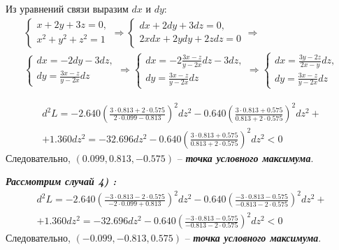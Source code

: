 \documentclass[a5paper, 10pt]{article}
\theoremstyle{definition}
\theoremstyle{plain}
\theoremstyle{remark}
\begin{document}
Из уравнений связи выразим $dx$ и $dy$:
\begin{multline}
\begin{cases}
 x + 2y+3z=0, \\
 x^2 +y^2+z^2=1
\end{cases}
\Rightarrow
\begin{cases}
 dx + 2dy+3dz=0, \\
 2xdx +2ydy+2zdz=0
\end{cases}
\Rightarrow \\
\begin{cases}
 dx = - 2dy-3dz, \\
 dy= \frac{3x - z}{y - 2x}dz
\end{cases}
\Rightarrow 
\begin{cases}
 dx = - 2 \frac{3x - z}{y - 2x}dz-3dz, \\
 dy= \frac{3x - z}{y - 2x}dz
\end{cases}
\Rightarrow 
\begin{cases}
 dx = \frac{3y- 2z}{2x -y}dz, \\
 dy= \frac{3x - z}{y - 2x}dz
\end{cases}
\end{multline}

\begin{multline}
 d^2L = -2.640 \left( \frac{3\cdot 0.813 +2 \cdot 0.575}{2\cdot 0.099 - 0.813} \right)^ 2dz^ 2  -0.640  \left( \frac{3\cdot 0.813 +0.575}{0.813 + 2\cdot 0.575}\right)^ 2dz^ 2  + \\
+ 1.360 dz^2 = -32.696 dz^2 -0.640  \left( \frac{3\cdot 0.813 +0.575}{0.813 + 2\cdot 0.575}\right)^ 2dz^ 2 < 0
\end{multline}
Следовательно, $(0.099, 0.813, -0.575)$ -- \textit{\textbf{точка условного максимума}}.


\newpage
\textit{\textbf{Рассмотрим случай 4) :}}
\begin{multline}
 d^2L = -2.640 \left( \frac{-3\cdot 0.813 -2 \cdot 0.575}{-2\cdot 0.099 + 0.813} \right)^ 2dz^ 2  -0.640  \left( \frac{-3\cdot 0.813 -0.575}{-0.813 - 2\cdot 0.575}\right)^ 2dz^ 2  + \\
+ 1.360 dz^2 = -32.696 dz^2 -0.640  \left( \frac{-3\cdot 0.813 -0.575}{-0.813 - 2\cdot 0.575}\right)^ 2dz^ 2 < 0
\end{multline}
Следовательно, $(-0.099, -0.813, 0.575)$ -- \textit{\textbf{точка условного максимума}}.
\end{document}
